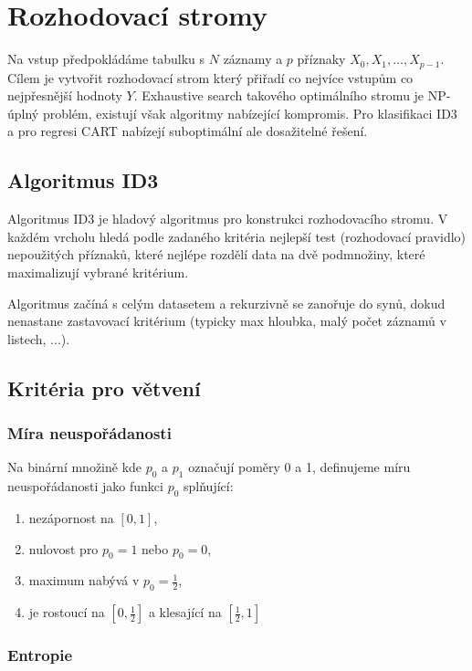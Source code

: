 \section{Rozhodovací stromy}

Na vstup předpokládáme tabulku s $N$ záznamy a $p$ příznaky $X_0, X_1, \dots, X_{p-1}$. Cílem je vytvořit rozhodovací strom který přiřadí co nejvíce vstupům co nejpřesnější hodnoty $Y$. Exhaustive search takového optimálního stromu je NP-úplný problém, existují však algoritmy nabízející kompromis. Pro klasifikaci ID3 a pro regresi CART nabízejí suboptimální ale dosažitelné řešení.

\subsection{Algoritmus ID3}

Algoritmus ID3 je hladový algoritmus pro konstrukci rozhodovacího stromu. V každém vrcholu hledá podle zadaného kritéria nejlepší test (rozhodovací pravidlo) nepoužitých příznaků, které nejlépe rozdělí data na dvě podmnožiny, které maximalizují vybrané kritérium.

Algoritmus začíná s celým datasetem a rekurzivně se zanořuje do synů, dokud nenastane zastavovací kritérium (typicky max hloubka, malý počet záznamů v listech, ...).

\subsection{Kritéria pro větvení}

\subsubsection{Míra neuspořádanosti}

Na binární množině kde $p_0$ a $p_1$ označují poměry 0 a 1, definujeme míru neuspořádanosti jako funkci $p_0$ splňující:
\begin{enumerate}
    \item nezápornost na $[0, 1]$,
    \item nulovost pro $p_0 = 1$ nebo $p_0 = 0$,
    \item maximum nabývá v $p_0 = \frac{1}{2}$,
    \item je rostoucí na $\left[0, \frac{1}{2}\right]$ a klesající na $\left[\frac{1}{2}, 1\right]$
\end{enumerate}

\subsubsection{Entropie}

